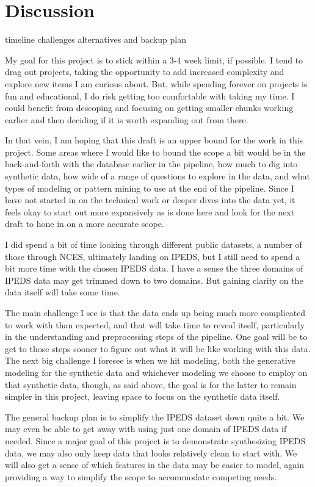 \documentclass[sigconf, authorversion, nonacm]{acmart}
\begin{document}
\section{Discussion}


    timeline
    challenges
    alternatives and backup plan



    My goal for this project is to stick within a 3-4 week limit, if possible. I tend to drag out projects, taking the opportunity to add increased complexity and explore new items I am curious about. But, while spending forever on projects is fun and educational, I do risk getting too comfortable with taking my time. I could benefit from descoping and focusing on getting smaller chunks working earlier and then deciding if it is worth expanding out from there.

    In that vein, I am hoping that this draft is an upper bound for the work in this project. Some areas where I would like to bound the scope a bit would be in the back-and-forth with the database earlier in the pipeline, how much to dig into synthetic data, how wide of a range of questions to explore in the data, and what types of modeling or pattern mining to use at the end of the pipeline. Since I have not started in on the technical work or deeper dives into the data yet, it feels okay to start out more expansively as is done here and look for the next draft to hone in on a more accurate scope.

    I did spend a bit of time looking through different public datasets, a number of those through NCES, ultimately landing on IPEDS, but I still need to spend a bit more time with the chosen IPEDS data. I have a sense the three domains of IPEDS data may get trimmed down to two domains. But gaining clarity on the data itself will take some time.

    The main challenge I see is that the data ends up being much more complicated to work with than expected, and that will take time to reveal itself, particularly in the understanding and preprocessing steps of the pipeline. One goal will be to get to those steps sooner to figure out what it will be like working with this data. The next big challenge I foresee is when we hit modeling, both the generative modeling for the synthetic data and whichever modeling we choose to employ on that synthetic data, though, as said above, the goal is for the latter to remain simpler in this project, leaving space to focus on the synthetic data itself.

    The general backup plan is to simplify the IPEDS dataset down quite a bit. We may even be able to get away with using just one domain of IPEDS data if needed. Since a major goal of this project is to demonstrate synthesizing IPEDS data, we may also only keep data that looks relatively clean to start with. We will also get a sense of which features in the data may be easier to model, again providing a way to simplify the scope to accommodate competing needs.
\end{document}
